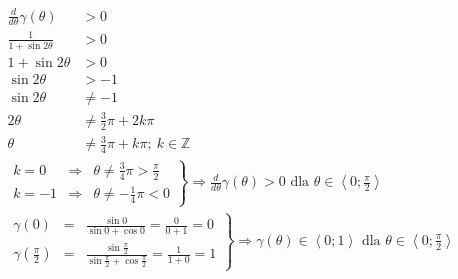         \begin{align*}
        	\frac{d}{d\theta}\gamma\left( \theta\right)& > 0& \hspace{10cm}\\
        	\frac{
        		1
        	}{
        		1 + \sin 2\theta
        	} & > 0\\
        	1 + \sin 2\theta & > 0\\
        	 \sin 2\theta & > -1\\
        	 \sin 2\theta & \neq -1\\
        	 2\theta & \neq \frac{3}{2}\pi + 2k\pi\\
        	 \theta & \neq \frac{3}{4}\pi + k\pi ; \ k \in \mathbb{Z}
        \end{align*}\alignspace
       	\begin{align*}
       		\left. \begin{array}{rcl}
       		 k = 0 & \Rightarrow & \theta \neq \frac{3}{4}\pi > \frac{\pi}{2}  \\
    	 	 k = -1 & \Rightarrow &\theta \neq -\frac{1}{4}\pi < 0
    	 	\end{array}    \right\}\Rightarrow \frac{d}{d\theta}\gamma\left( \theta\right) > 0 \text{ dla } \theta \in \left\langle 0;\frac{\pi}{2}\right\rangle& \hspace{10cm}
        \end{align*}\alignspace
       	\begin{align*}
       	\left. \begin{array}{rcl}
       		\gamma\left( 0\right) & = &\frac{\sin 0}{\sin 0 + \cos 0} = \frac{0}{0 + 1} = 0\\	
       		\gamma\left( \frac{\pi}{2}\right) & = &\frac{\sin  \frac{\pi}{2}}{\sin  \frac{\pi}{2} + \cos  \frac{\pi}{2}} = \frac{1}{1 + 0}= 1
       	\end{array} \right\} \Rightarrow \gamma\left( \theta\right) \in \left\langle 0;1\right\rangle \text{ dla } \theta \in \left\langle 0;\frac{\pi}{2}\right\rangle& \hspace{10cm}
        \end{align*}\alignspace